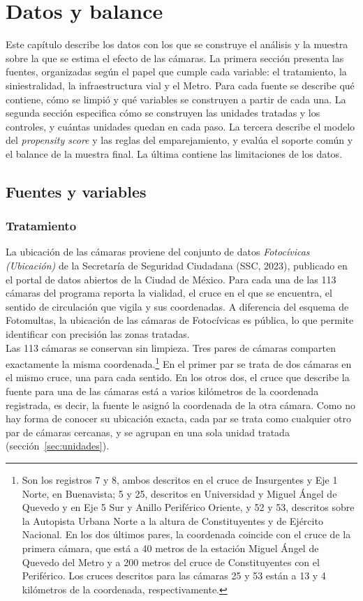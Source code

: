 \chapter{Datos y balance}
\label{chap:datos}

\noindent Este capítulo describe los datos con los que se construye el análisis y la muestra sobre la que se estima el efecto de las cámaras. La primera sección presenta las fuentes, organizadas según el papel que cumple cada variable: el tratamiento, la siniestralidad, la infraestructura vial y el Metro. Para cada fuente se describe qué contiene, cómo se limpió y qué variables se construyen a partir de cada una. La segunda sección especifica cómo se construyen las unidades tratadas y los controles, y cuántas unidades quedan en cada paso. La tercera describe el modelo del \emph{propensity score} y las reglas del emparejamiento, y evalúa el soporte común y el balance de la muestra final. La última contiene las limitaciones de los datos.

\section{Fuentes y variables}

\subsection{Tratamiento}

\noindent La ubicación de las cámaras proviene del conjunto de datos \emph{Fotoc\'ivicas (Ubicación)} de la Secretaría de Seguridad Ciudadana (SSC, 2023), publicado en el portal de datos abiertos de la Ciudad de México. Para cada una de las 113 cámaras del programa reporta la vialidad, el cruce en el que se encuentra, el sentido de circulación que vigila y sus coordenadas. A diferencia del esquema de Fotomultas, la ubicación de las cámaras de Fotocívicas es pública, lo que permite identificar con precisión las zonas tratadas.\\

Las 113 cámaras se conservan sin limpieza. Tres pares de cámaras comparten exactamente la misma coordenada.\footnote{Son los registros 7 y 8, ambos descritos en el cruce de Insurgentes y Eje 1 Norte, en Buenavista; 5 y 25, descritos en Universidad y Miguel Ángel de Quevedo y en Eje 5 Sur y Anillo Periférico Oriente, y 52 y 53, descritos sobre la Autopista Urbana Norte a la altura de Constituyentes y de Ejército Nacional. En los dos últimos pares, la coordenada coincide con el cruce de la primera cámara, que está a 40 metros de la estación Miguel Ángel de Quevedo del Metro y a 200 metros del cruce de Constituyentes con el Periférico. Los cruces descritos para las cámaras 25 y 53 están a 13 y 4 kilómetros de la coordenada, respectivamente.} En el primer par se trata de dos cámaras en el mismo cruce, una para cada sentido. En los otros dos, el cruce que describe la fuente para una de las cámaras está a varios kilómetros de la coordenada registrada, es decir, la fuente le asignó la coordenada de la otra cámara. Como no hay forma de conocer su ubicación exacta, cada par se trata como cualquier otro par de cámaras cercanas, y se agrupan en una sola unidad tratada (sección~\ref{sec:unidades}).\\

